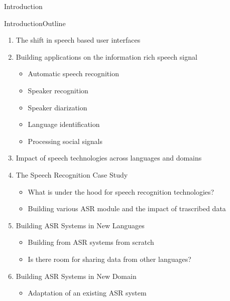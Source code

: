 \begin{frame}
  \begin{center}
    {\color{Maroon}\Huge Introduction}
  \end{center}
\end{frame}

\begin{frame}{Introduction}{Outline}
  \begin{enumerate}
  \item The shift in speech based user interfaces
  \item Building applications on the information rich speech signal
    \begin{itemize}
    \item Automatic speech recognition
    \item Speaker recognition
    \item Speaker diarization
    \item Language identification
    \item Processing social signals
    \end{itemize}
  \item Impact of speech technologies across languages and domains
  \item The Speech Recognition Case Study
    \begin{itemize}
    \item What is under the hood for speech recognition technologies?
    \item Building various ASR module and the impact of trascribed data
    \end{itemize}
  \item Building ASR Systems in New Languages
    \begin{itemize}
    \item Building from ASR systems from scratch
    \item Is there room for sharing data from other languages?
    \end{itemize}
  \item Building ASR Systems in New Domain
    \begin{itemize}
    \item Adaptation of an existing ASR system
    \end{itemize}
  \end{enumerate}
\end{frame}
